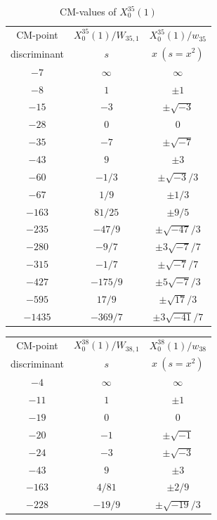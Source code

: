 \documentclass{amsart}
\theoremstyle{definition}
\begin{document}
\begin{appendices}
\begin{table}[H]
\begin{tabular}{|c|c|c|}
\hline
CM-point& ${X_{0}^{35}(1)/W_{35,1}}$ & ${X_{0}^{35}(1)/w_{35}}$  \\ 
         discriminant & $s$ & $x\ (s=x^2)$  \\ \hline
${-7}$ & $\infty$ & $\infty$  \\ 
${-8}$ & $1$ & $\pm 1$   \\ 
${-15}$ & $-3$ & $\pm \sqrt{-3}$  \\ 
${-28}$ & $0$ & $0$ \\ 
${-35}$ & $-7$ & $\pm \sqrt{-7}$  \\ 
${-43}$ & $9$ & $\pm 3$  \\ 
${-60}$ & $-{1}/{3}$ & $\pm {\sqrt{-3}}/{3}$ \\ 
${-67}$ & ${1}/{9}$ & $ \pm{1}/{3}$  \\ 

${-163}$ & ${81}/{25}$ & $ \pm{9}/{5}$  \\
${-235}$ & $-{47}/{9}$ & $ \pm{\sqrt{-47}}/{3}$  \\ 


${-280}$ & $-{9}/{7}$ & $ \pm{3\sqrt{-7}}/{7}$ \\ 
${-315}$ & $-{1}/{7}$ & $ \pm {\sqrt{-7}}/{7}$ \\ 
${-427}$ & $-{175}/{9}$ & $ \pm{{5\sqrt{
-7}}}/{3}$  \\ 
${-595}$ & ${17}/{9}$ & $ \pm{\sqrt{17}}/{3}$  \\
${-1435}$ & $-{369}/{7}$ & $ \pm{3\sqrt{-41}}/{7}$ \\ \hline
\end{tabular}
\caption{CM-values of $X^{35}_0(1)$}
\end{table}


\begin{table}
\begin{tabular}{|c|c|c|}
\hline
CM-point& ${X_{0}^{38}(1)/W_{38,1}}$ & ${X_{0}^{38}(1)/w_{38}}$  \\ 
         discriminant & $s$ & $x\ (s=x^2)$  \\ \hline
${-4}$ & $\infty$ & $\infty$  \\ 
${-11}$ & $1$ & $\pm 1$  \\ 
${-19}$ & $0$ & $0$ \\ 
${-20}$ & $-1$ & $\pm \sqrt{-1}$ \\ 
${-24}$ & $-3$ & $\pm \sqrt{-3}$ \\ 
${-43}$ & $9$ & $\pm 3$  \\ 
${-163}$ & ${4}/{81}$ & $\pm {2}/{9}$  \\ 
${-228}$ & $-{19}/{9}$ & $ \pm{\sqrt{-19}}/{3}$   \\ 



\end{tabular}
\end{table}
\end{appendices}
\end{document}
